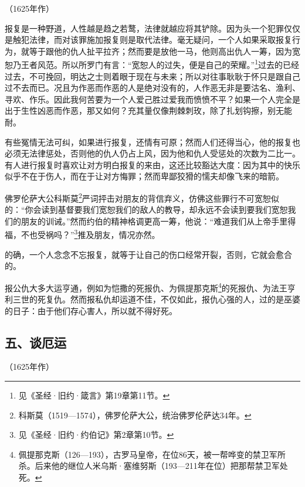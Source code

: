 \begin{center}
    （1625年作）
\end{center}
\par 报复是一种野道，人性越是趋之若鹜，法律就越应将其铲除。因为头一个犯罪仅仅是触犯法律，而对该罪施加报复则是取代法律。毫无疑问，一个人如果采取报复行为，就等于跟他的仇人扯平拉齐；然而要是放他一马，他则高出仇人一筹，因为宽恕乃王者风范。所以所罗门有言：“宽恕人的过失，便是自己的荣耀。”\footnote{见《圣经·旧约·箴言》第19章第11节。}过去的已经过去，不可挽回，明达之士则着眼于现在与未来；所以对往事耿耿于怀只是跟自己过不去而已。况且为作恶而作恶的人是绝对没有的，人作恶无非是要沽名、渔利、寻欢、作乐。因此我何苦要为一个人爱己胜过爱我而愤愤不平？如果一个人完全是出于生性凶恶而作恶，那又如何？充其量仅像荆棘刺玫，除了扎划钩擦，别无能耐。
\par 有些冤情无法可纠，如果进行报复，还情有可原；然而人们还得当心，他的报复也必须无法律惩处，否则他的仇人仍占上风，因为他和仇人受惩处的次数为二比一。有人进行报复时喜欢让对方明白报复的来由，这还比较豁达大度：因为其中的快乐似乎不在于伤人，而在于让对方悔罪；然而卑鄙狡猾的懦夫却像飞来的暗箭。
\par 佛罗伦萨大公科斯莫\footnote{科斯莫（1519—1574），佛罗伦萨大公，统治佛罗伦萨达34年。}严词抨击对朋友的背信弃义，仿佛这些罪行不可宽恕似的：“你会读到基督要我们宽恕我们的敌人的教导，却永远不会读到要我们宽恕我们的朋友的训诫。”然而约伯的精神格调更高一筹，他说：“难道我们从上帝手里得福，不也受祸吗？”\footnote{见《圣经·旧约·约伯记》第2章第10节。}推及朋友，情况亦然。
\par 的确，一个人念念不忘报复，就等于让自己的伤口经常开裂，否则，它就会愈合的。
\par 报公仇大多大运亨通，例如为恺撒的死报仇、为佩提那克斯\footnote{佩提那克斯（126—193），古罗马皇帝，在位86天，被一帮哗变的禁卫军所杀。后来他的继位人米乌斯·塞维努斯（193—211年在位）把那帮禁卫军处死。}的死报仇、为法王亨利三世的死复仇。然而报私仇却运道不佳，不仅如此，报仇心强的人，过的是巫婆的日子：由于他们存心害人，所以就不得好死。


\subsection*{五、谈厄运}

\begin{center}
    （1625年作）
\end{center}

